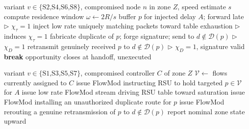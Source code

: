 \documentclass[lettersize,journal]{IEEEtran}
\renewcommand{\Comment}[1]{\hfill$\triangleright$ #1}
\begin{document}
\begin{algorithm}[t]
\caption{Data Plane Procedure}
\label{alg:dataplane}
\begin{algorithmic}[1]
\small
{}
\Require variant $v\in\{\text{S2,S4,S6,S8}\}$, compromised node $n$ in zone $Z$, speed estimate $s$
\State compute residence window $\omega \gets 2R/s$
      \State buffer $p$ for injected delay $A$; forward late \Comment{$\chi_\tau{=}1$}
      \State inject low rate uniquely matching packets toward table exhaustion \Comment{induces $\chi_\tau{=}1$}
      \State fabricate duplicate of $p$; forge signature; send to $d\notin\mathcal{D}(p)$ \Comment{$\chi_D{=}1$}
    \Else
      \State retransmit genuinely received $p$ to $d\notin\mathcal{D}(p)$ \Comment{$\chi_D{=}1$, signature valid}
    \EndIf
    \State \textbf{break}
  \EndIf
\EndWhile
{}
  \State opportunity closes at handoff, unexecuted
\EndIf
\end{algorithmic}
\end{algorithm}

\begin{algorithm}[t]
\caption{Control Plane Procedure}
\label{alg:ctrlplane}
\begin{algorithmic}[1]
\small
{}
\Require variant $v\in\{\text{S1,S3,S5,S7}\}$, compromised controller $C$ of zone $Z$
\State $\mathcal{V} \gets$ flows currently assigned to $C$
  \State issue FlowMod instructing RSU to hold targeted $p\in\mathcal{V}$ for $A$
  \State issue low rate FlowMod stream driving RSU table toward saturation
  \State issue FlowMod installing an unauthorized duplicate route for $p$
\Else
  \State issue FlowMod rerouting a genuine retransmission of $p$ to $d\notin\mathcal{D}(p)$
\EndIf
\State report nominal zone state upward
\end{algorithmic}
\end{algorithm}

\end{document}
